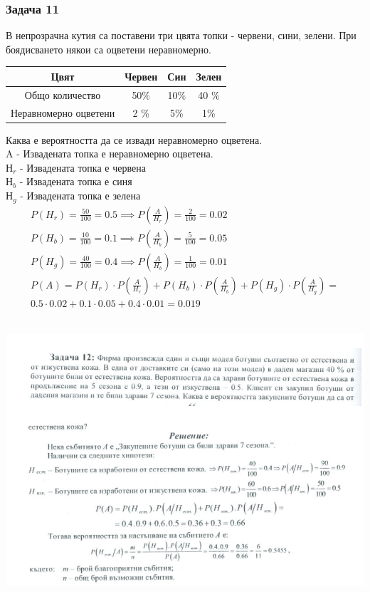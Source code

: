 \documentclass[fleqn, 12pt]{article}
\theoremstyle{definition}
\begin{document}
\subsubsection*{Задача 11}
В непрозрачна кутия са поставени три цвята топки - червени, сини, зелени. При боядисването някои са оцветени неравномерно. 
\begin{center}
\begin{tabular}{|c|c|c|c|} 
\hline
Цвят & Червен & Син & Зелен \\
\hline
Общо количество  & 50\% & 10\% & 40 \% \\
\hline
Неравномерно оцветени & 2 \% & 5\% & 1\% \\
\hline
\end{tabular}
\end{center}
Каква е вероятността да се извади неравномерно оцветена. \\
A - Извадената топка е неравномерно оцветена. \\
$Н_{r}$ - Извадената топка е червена \\
$Н_{b}$ - Извадената топка е синя \\
$Н_{g}$ - Извадената топка е зелена 
\begin{gather*}
P(H_{r}) = \frac{50}{100} = 0.5 \implies P \left( \frac{A}{H_{r}} \right) = \frac{2}{100} = 0.02 \\
P(H_{b}) = \frac{10}{100} = 0.1 \implies P \left( \frac{A}{H_{b}} \right) = \frac{5}{100} = 0.05 \\
P(H_{g}) = \frac{40}{100} = 0.4 \implies P \left( \frac{A}{H_{b}} \right) = \frac{1}{100} = 0.01 \\
P(A) = P(H_{r}) \cdot P\left( \frac{A}{H_{r}}\right) +
P(H_{b})\cdot P\left( \frac{A}{H_{b}} \right)+
P(H_{g})\cdot P\left( \frac{A}{H_{g}} \right) = \\
0.5 \cdot 0.02 + 0.1 \cdot 0.05 + 0.4 \cdot 0.01 = 0.019 
\end{gather*}
\\
\begin{center}
\includegraphics{Pics/Discrete math/ex10/ex10-task12.png}
\end{center}
\newpage
\end{document}
